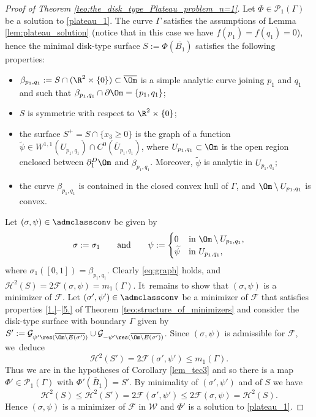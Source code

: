 \begin{proof}[Proof of Theorem \ref{teo:the_disk_type_Plateau_problem_n=1}] Let $\Phi\in\mathcal{P}_1(\Gamma)$ be a solution to \eqref{plateau_1}.
The curve $\Gamma$
satisfies the assumptions
of Lemma \ref{lem:plateau_solution} (notice that in this case we have $f(p_1) = f(q_1)=0$), hence the minimal disk-type surface $S:=\Phi(\overline{B_1})$ satisfies the following properties:
\begin{itemize}
\item $\beta_{p_1,q_1}:=S\cap (\R^2\times\{0\})\subset \overline \Om$
is a simple analytic curve
joining $p_1$ and $q_1$ and such that $\beta_{p_1,q_1}\cap\partial\Om=\{p_1,q_1\}$;
\item $S$ is symmetric with respect to $\R^2\times\{0\}$;
\item the surface $S^+=S\cap\{x_3\ge0\}$ is the graph of a
function $\widetilde\psi\in W^{1,1}(U_{p_1,q_1})\cap C^0(\overline U_{p_1,q_1})$, where $U_{p_1,q_1}\subset \Om$ is the open region enclosed between $\partial_1^D\Om$ and $\beta_{p_1,q_1}$. Moreover, $\widetilde\psi$ is analytic in $U_{p_1,q_1}$;
\item the curve $\beta_{p_1,q_1}$ is contained in the closed
convex hull of $\Gamma$, and $\Om\setminus U_{p_1,q_1}$ is convex.
\end{itemize}

Let $(\sigma,\psi)\in\admclassconv$ be given by
\[
\sigma:=\sigma_1\qquad\text{and}\qquad
\psi:=\begin{cases}
0& \text{in } \Om\setminus U_{p_1,q_1},\\
\widetilde\psi & \text{in } U_{p_1,q_1},
\end{cases}
\]
where $\sigma_1([0,1])=\beta_{p_1,q_1}$.
Clearly \eqref{eq:graph} holds, and $\mathcal H^2(S)=2\mathcal F(\sigma,\psi)=m_1(\Gamma)$. It~remains to show that $(\sigma,\psi)$ is a minimizer of $\mathcal F$.
Let $(\sigma',\psi')\in\admclassconv$ be a minimizer of $\mathcal F$ that satisfies properties \ref{1.}--\ref{5.} of Theorem \ref{teo:structure_of_minimizers} and consider the disk-type surface with boundary $\Gamma$ given by $S':=\mathcal{G}_{\psi'\res(\overline{\Om\setminus E(\sigma')})}
\cup \mathcal{G}_{-\psi'\res(\overline{\Om\setminus E(\sigma')})}$.
Since $(\sigma,\psi)$ is admissible for $\mathcal F$, we~deduce
\[
\mathcal{H}^2(S')=2\mathcal F(\sigma',\psi')\leq m_1(\Gamma).
\]
Thus we are in the hypotheses of Corollary \ref{lem_tec3} and so there is a map
$\Phi'\in \mathcal P_1(\Gamma) $ with $\Phi'(\overline B_1)=S'$.
By minimality of $(\sigma',\psi')$ and of $S$ we have
\begin{equation}
\mathcal H^2(S)\le \mathcal{H}^2(S')=2\mathcal{F}(\sigma',\psi')\le 2\mathcal{F}(\sigma,\psi)=\mathcal H^2(S).
\end{equation}
Hence $(\sigma,\psi)$ is a minimizer of $\mathcal F$ in $\mathcal W$ and $\Phi'$ is a solution to \eqref{plateau_1}.


\end{proof}
